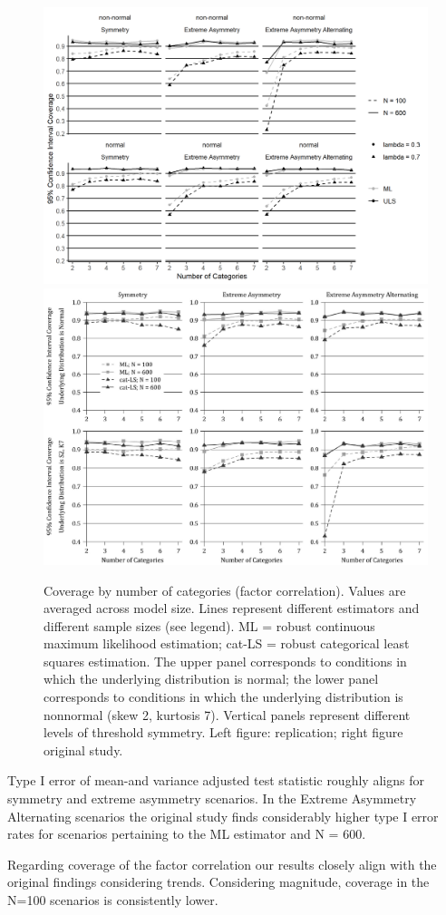 \documentclass[10,a4paperpaper,]{article}
\begin{document}
\begin{figure}
\includegraphics[width=0.49\linewidth]{./figures/fig_8} \includegraphics[width=0.49\linewidth]{./figures/fig8_original} \caption{Coverage by number of categories (factor correlation). Values are averaged across model size. Lines represent different estimators and different sample sizes (see legend). ML = robust continuous maximum likelihood estimation; cat-LS = robust categorical least squares estimation. The upper panel corresponds to conditions in which the underlying distribution is normal; the lower panel corresponds to conditions in which the underlying distribution is nonnormal (skew 2, kurtosis 7). Vertical panels represent different levels of threshold symmetry. Left figure: replication; right figure original study.}\label{fig:fig8}
\end{figure}

Type I error of mean-and variance adjusted test statistic roughly aligns
for symmetry and extreme asymmetry scenarios. In the Extreme Asymmetry
Alternating scenarios the original study finds considerably higher type
I error rates for scenarios pertaining to the ML estimator and N = 600.

Regarding coverage of the factor correlation our results closely align
with the original findings considering trends. Considering magnitude,
coverage in the N=100 scenarios is consistently lower.
\end{document}
